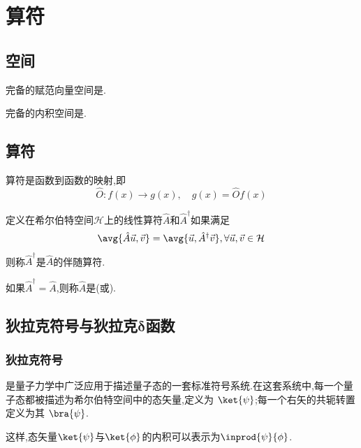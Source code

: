 \documentclass{ctexbook}
\begin{document}
\section{算符}
\subsection{空间}
\begin{definition}[巴拿赫空间]
    完备的赋范向量空间是.
\end{definition}
\begin{definition}[希尔伯特空间]
    完备的内积空间是.
\end{definition}
\subsection{算符}
\begin{definition}[算符]
    算符是函数到函数的映射,即
    \[\hat{O}:f(x)\to g(x),\quad g(x)=\hat{O}f(x)\]
\end{definition}
\begin{definition}[伴随算符]
    定义在希尔伯特空间$\mathcal{H}$上的线性算符$\hat{A}$和$\hat{A}^\dagger$如果满足
    \[\avg{\hat{A}\vec{u},\vec{v}}=\avg{\vec{u},\hat{A}^\dagger\vec{v}},\forall\vec{u},\vec{v}\in\mathcal{H}\]
    则称$\hat{A}^\dagger$是$\hat{A}$的伴随算符.
\end{definition}
\begin{definition}[厄米算符]
    如果$\hat{A}^\dagger=\hat{A}$,则称$\hat{A}$是(或).
\end{definition}
\subsection{狄拉克符号与狄拉克$\symbf\delta$函数}
\subsubsection{狄拉克符号}
\begin{definition}[狄拉克符号]
    是量子力学中广泛应用于描述量子态的一套标准符号系统.在这套系统中,每一个量子态都被描述为希尔伯特空间中的态矢量,定义为 $\ket{\psi}$;每一个右矢的共轭转置定义为其 $\bra{\psi}$.
\end{definition}
这样,态矢量$\ket{\psi}$与$\ket{\phi}$的内积可以表示为$\inprod{\psi}{\phi}$.
\end{document}

